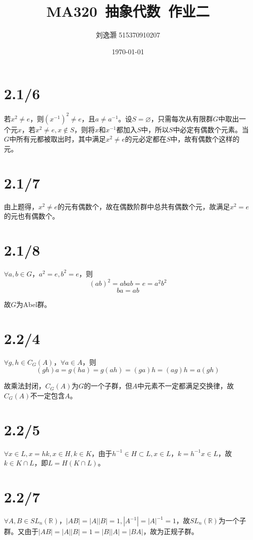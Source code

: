 \documentclass{article}
\title{MA320\ 抽象代数\ 作业二}
\author{刘逸灏 515370910207}
\date{\today}
\begin{document}
\maketitle

\section{2.1/6}
若$x^2\neq e$，则$(x^{-1})^2\neq e$，且$a\neq a^{-1}$。设$S=\varnothing$，只需每次从有限群$G$中取出一个元$x$，若$x^2\neq e,x\not\in S$，则将$x$和$x^{-1}$都加入$S$中，所以$S$中必定有偶数个元素。当$G$中所有元都被取出时，其中满足$x^2\neq e$的元必定都在$S$中，故有偶数个这样的元。

\section{2.1/7}
由上题得，$x^2\neq e$的元有偶数个，故在偶数阶群中总共有偶数个元，故满足$x^2=e$的元也有偶数个。

\section{2.1/8}
$\forall a,b\in G$，$a^2=e,b^2=e$，则
$$(ab)^2=abab=e=a^2b^2$$
$$ba=ab$$

故$G$为Abel群。

\section{2.2/4}
$\forall g,h\in C_G(A)$，$\forall a\in A$，则
$$(gh)a=g(ha)=g(ah)=(ga)h=(ag)h=a(gh)$$

故乘法封闭，$C_G(A)$为$G$的一个子群，但$A$中元素不一定都满足交换律，故$C_G(A)$不一定包含$A$。

\section{2.2/5}
$\forall x\in L,x=hk,x\in H,k\in K$，由于$h^{-1}\in H\subset L,x\in L$，$k=h^{-1}x\in L$，故$k\in K\cap L$，即$L=H(K\cap L)$。

\section{2.2/7}
$\forall A,B\in SL_n(\mathbb{R})$，$|AB|=|A||B|=1,|A^{-1}|=|A|^{-1}=1$，故$SL_n(\mathbb{R})$为一个子群。又由于$|AB|=|A||B|=1=|B||A|=|BA|$，故为正规子群。
\end{document}
